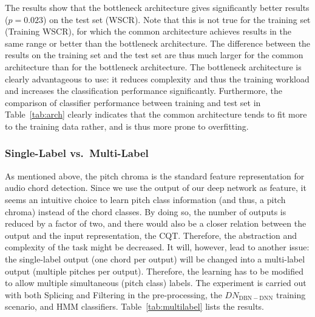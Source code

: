 \documentclass{article}
\begin{document}
The results show that the bottleneck architecture gives significantly better results ($p=0.023$) on the test set (WSCR). Note that this is not true for the training set (Training WSCR), for which the common architecture achieves results in the same range or better than the bottleneck architecture. The difference between the results on the training set and the test set are thus much larger for the common architecture than for the bottleneck architecture.
The bottleneck architecture is clearly advantageous to use: it reduces complexity and thus the training workload and increases the classification performance significantly. Furthermore, the comparison of classifier performance between training and test set in Table~\ref{tab:arch} clearly indicates that the common architecture tends to fit more to the training data rather, and is thus more prone to overfitting. 


\subsubsection{Single-Label vs.\ Multi-Label}
As mentioned above, the pitch chroma is the standard feature representation for audio chord detection. Since we use the output of our deep network as feature, it seems an intuitive choice to learn pitch class information (and thus, a pitch chroma) instead of the chord classes. By doing so, the number of outputs is reduced by a factor of two, and there would also be a closer relation between the output and the input representation, the CQT. Therefore, the abstraction and complexity of the task might be decreased. It will, however, lead to another issue: the single-label output (one chord per output) will be changed into a multi-label output (multiple pitches per output). Therefore, the learning has to be modified to allow multiple simultaneous (pitch class) labels. 
The experiment is carried out with both Splicing and Filtering in the pre-processing, the $DN_\mathrm{DBN-DNN}$ training scenario, and HMM classifiers. Table~\ref{tab:multilabel} lists the results. 
\end{document}
